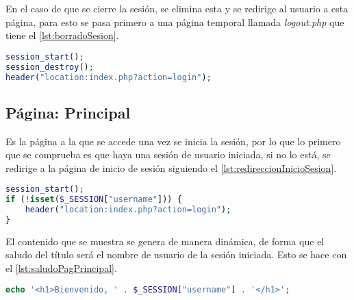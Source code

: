 En el caso de que se cierre la sesión, se elimina esta y se redirige al usuario a esta página, para esto se pasa primero a una página temporal llamada \textit{logout.php} que tiene el \autoref{lst:borradoSesion}.
\begin{lstlisting}[language=PHP, caption=Borrado de sesión y redirección a la página de inicio, label=lst:borradoSesion]
session_start();
session_destroy();
header("location:index.php?action=login");
\end{lstlisting}

\subsection{Página: Principal}\label{subsec:implPagPrincipal}
Es la página a la que se accede una vez se inicia la sesión, por lo que lo primero que se comprueba es que haya una sesión de usuario iniciada, si no lo está, se redirige a la página de inicio de sesión siguiendo el \autoref{lst:redireccionInicioSesion}.
\begin{lstlisting}[language=PHP, caption=Redirección a la página de inicio de sesión si sesión no iniciada, label=lst:redireccionInicioSesion]
session_start();
if (!isset($_SESSION["username"])) {
    header("location:index.php?action=login");
}
\end{lstlisting}

El contenido que se muestra se genera de manera dinámica, de forma que el saludo del título será el nombre de usuario de la sesión iniciada. Esto se hace con el \autoref{lst:saludoPagPrincipal}.
\pagebreak

\begin{lstlisting}[language=PHP, caption=Saludo página principal, label=lst:saludoPagPrincipal]
echo '<h1>Bienvenido, ' . $_SESSION["username"] . '</h1>';
\end{lstlisting}

